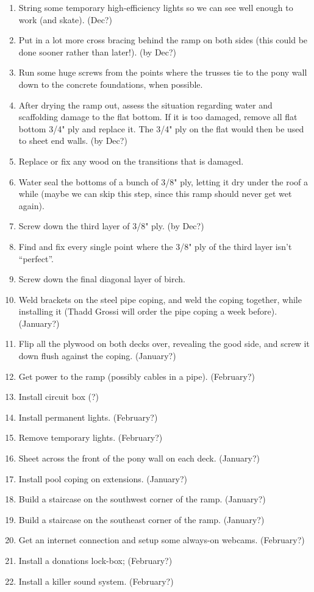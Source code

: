 \documentclass{article}
\begin{document}
\begin{enumerate}
\item String some temporary high-efficiency lights so we can see well enough to work (and skate). (Dec?)
\item Put in a lot more cross bracing behind the ramp on both sides (this could be done sooner rather than later!). (by Dec?)
\item Run some huge screws from the points where the trusses tie to
  the pony wall down to the concrete foundations, when possible.
\item After drying the ramp out, assess the situation regarding water and scaffolding damage to the flat bottom.  If it is too damaged, remove all flat bottom 3/4" ply and replace it.  The 3/4" ply on the flat would then be used to sheet end walls.  (by Dec?)
\item Replace or fix any wood on the transitions that is damaged. 
\item Water seal the bottoms of a bunch of 3/8" ply, letting it dry under the roof a while (maybe we can skip this step, since this ramp should never get wet again).
\item Screw down the third layer of 3/8" ply. (by Dec?)
\item Find and fix every single point where the 3/8" ply of the third layer isn't ``perfect''. 
\item Screw down the final diagonal layer of birch. 
\item Weld brackets on the steel pipe coping, and weld the coping together, while installing it (Thadd Grossi will order the pipe coping a week before). (January?)
\item Flip all the plywood on both decks over, revealing the good side, and screw it down flush against the coping.  (January?) 
\item Get power to the ramp (possibly cables in a pipe).   (February?)
\item Install circuit box (?)  
\item Install permanent lights. (February?)
\item Remove temporary lights.   (February?)
\item Sheet across the front of the pony wall on each deck.   (January?)
\item Install pool coping on extensions.   (January?)
\item Build a staircase on the southwest corner of the ramp.   (January?)
\item Build a staircase on the southeast corner of the ramp.    (January?)
\item Get an internet connection and setup some always-on webcams.  (February?)
\item Install a donations lock-box;   (February?)
\item Install a killer sound system.  (February?)
\end{enumerate}
\end{document}
